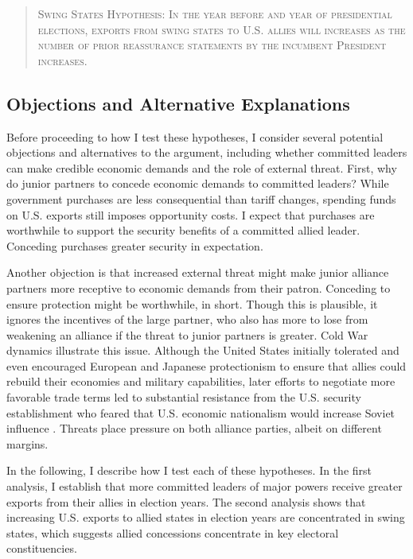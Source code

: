 \documentclass[12pt]{article}
\begin{document}
\begin{quote}
\textsc{Swing States Hypothesis: In the year before and year of presidential elections, exports from swing states to U.S. allies will increases as the number of prior reassurance statements by the incumbent President increases.}
\end{quote}



\subsection{Objections and Alternative Explanations}


Before proceeding to how I test these hypotheses, I consider several potential objections and alternatives to the argument, including whether committed leaders can make credible economic demands and the role of external threat.
First, why do junior partners to concede economic demands to committed leaders? 
While government purchases are less consequential than tariff changes, spending funds on U.S. exports still imposes opportunity costs.
I expect that purchases are worthwhile to support the security benefits of a committed allied leader. 
Conceding purchases greater security in expectation. 


Another objection is that increased external threat might make junior alliance partners more receptive to economic demands from their patron.
Conceding to ensure protection might be worthwhile, in short.
Though this is plausible, it ignores the incentives of the large partner, who also has more to lose from weakening an alliance if the threat to junior partners is greater. 
Cold War dynamics illustrate this issue.
Although the United States initially tolerated and even encouraged European and Japanese protectionism to ensure that allies could rebuild their economies and military capabilities, later efforts to negotiate more favorable trade terms led to substantial resistance from the U.S. security establishment who feared that U.S. economic nationalism would increase Soviet influence \citep{Mastanduno1998}.
Threats place pressure on both alliance parties, albeit on different margins.


In the following, I describe how I test each of these hypotheses. 
In the first analysis, I establish that more committed leaders of major powers receive greater exports from their allies in election years. 
The second analysis shows that increasing U.S. exports to allied states in election years are concentrated in swing states, which suggests allied concessions concentrate in key electoral constituencies.
\end{document}

